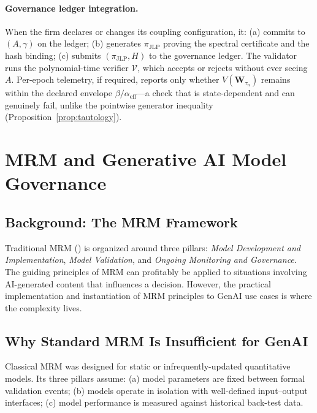 \documentclass[12pt]{article}
\theoremstyle{plain}
\theoremstyle{definition}
\newcommand{\W}{\mathbf{W}}
\begin{document}
\paragraph{Governance ledger integration.}
When the firm declares or changes its coupling configuration, it:
(a) commits to $(A,\gamma)$ on the ledger;
(b) generates $\pi_{\mathrm{JLP}}$ proving the spectral certificate and the
hash binding;
(c) submits $(\pi_{\mathrm{JLP}}, H)$ to the governance ledger.
The validator runs the polynomial-time verifier $\mathcal{V}$, which accepts
or rejects without ever seeing $A$.  Per-epoch telemetry, if required,
reports only whether $V(\W_{\tau_n})$ remains within the declared envelope
$\beta/\alpha_{\mathrm{eff}}$---a check that is state-dependent and can
genuinely fail, unlike the pointwise generator inequality
(Proposition~\ref{prop:tautology}).

\section{MRM and Generative AI Model Governance}
\label{sec:sr117}

\subsection{Background: The MRM Framework}

Traditional MRM (\cite{sr117}) is organized around three pillars: \emph{Model Development and
Implementation}, \emph{Model Validation}, and \emph{Ongoing Monitoring
and Governance}.  The guiding principles of MRM can profitably be applied to situations involving AI-generated content that influences
a decision. However, the practical implementation and instantiation of MRM principles to GenAI use cases is where the complexity lives. 

\subsection{Why Standard MRM Is Insufficient for GenAI}

Classical MRM was designed for static or infrequently-updated
quantitative models.  Its three pillars assume:
(a) model parameters are fixed between formal validation events;
(b) models operate in isolation with well-defined input--output interfaces;
(c) model performance is measured against historical back-test data.
\end{document}
